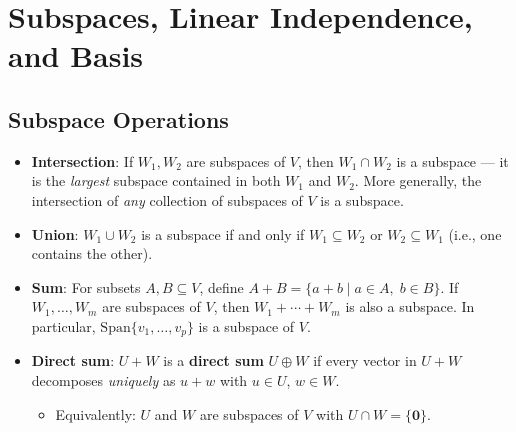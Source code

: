 \documentclass[hidelinks]{article}
\begin{document}
\section{Subspaces, Linear Independence, and Basis}

\subsection{Subspace Operations}
\begin{itemize}
    \item \textbf{Intersection}: If $W_1, W_2$ are subspaces of $V$, then $W_1 \cap W_2$ is a subspace — it is the \emph{largest} subspace contained in both $W_1$ and $W_2$. More generally, the intersection of \emph{any} collection of subspaces of $V$ is a subspace.
    \item \textbf{Union}: $W_1 \cup W_2$ is a subspace if and only if $W_1 \subseteq W_2$ or $W_2 \subseteq W_1$ (i.e., one contains the other).
    \item \textbf{Sum}: For subsets $A, B \subseteq V$, define $A + B = \{a + b \mid a\in A,\; b\in B\}$. If $W_1, \ldots, W_m$ are subspaces of $V$, then $W_1 + \cdots + W_m$ is also a subspace. In particular, $\mathrm{Span}\{v_1,\ldots,v_p\}$ is a subspace of $V$.
    \item \textbf{Direct sum}: $U + W$ is a \textbf{direct sum} $U \oplus W$ if every vector in $U+W$ decomposes \emph{uniquely} as $u+w$ with $u\in U$, $w\in W$.
    \begin{itemize}
        \item Equivalently: $U$ and $W$ are subspaces of $V$ with $U \cap W = \{\mathbf{0}\}$.
    \end{itemize}
\end{itemize}
\end{document}
